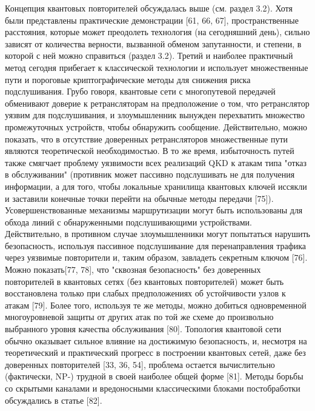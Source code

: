 Концепция квантовых повторителей обсуждалась выше (см. раздел 3.2). Хотя были представлены практические демонстрации [61, 66, 67], пространственные расстояния, которые может преодолеть технология (на сегодняшний день), сильно зависят от количества верности, вызванной обменом запутанности, и степени, в которой с ней можно справиться (раздел 3.2).
Третий и наиболее практичный метод сегодня прибегает к классической технологии и использует множественные пути и пороговые криптографические методы для снижения риска подслушивания. Грубо говоря, квантовые сети с многопутевой передачей обменивают доверие к ретрансляторам на предположение о том, что ретранслятор уязвим для подслушивания, и злоумышленник вынужден перехватить множество промежуточных устройств, чтобы обнаружить сообщение. Действительно, можно показать, что в отсутствие доверенных ретрансляторов множественные пути являются теоретической необходимостью. В то же время, избыточность путей также смягчает проблему уязвимости всех реализаций QKD к атакам типа "отказ в обслуживании" (противник может пассивно подслушивать не для получения информации, а для того, чтобы локальные хранилища квантовых ключей иссякли и заставили конечные точки перейти на обычные методы передачи [75]).
Усовершенствованные механизмы маршрутизации могут быть использованы для обхода линий с обнаруженными подслушивающими устройствами.
Действительно, в противном случае злоумышленники могут попытаться нарушить безопасность, используя пассивное подслушивание для перенаправления трафика через уязвимые повторители и, таким образом, завладеть секретным ключом [76]. Можно показать[77, 78], что "сквозная безопасность" без доверенных повторителей в квантовых сетях (без квантовых повторителей) может быть восстановлена только при слабых предположениях об устойчивости узлов к атакам [79].
Более того, используя те же методы, можно добиться одновременной многоуровневой защиты от других атак по той же схеме до произвольно выбранного уровня качества обслуживания [80]. Топология квантовой сети обычно оказывает сильное влияние на достижимую безопасность, и, несмотря на теоретический и практический прогресс в построении квантовых сетей, даже без доверенных повторителей [33, 36, 54], проблема остается вычислительно (фактически, NP-) трудной в своей наиболее общей форме [81]. Методы борьбы со скрытыми каналами и вредоносными классическими блоками постобработки обсуждались в статье [82].
